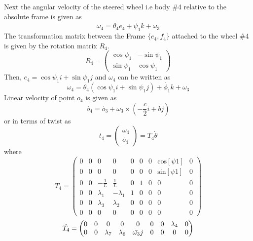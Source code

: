 {Next  the angular velocity of the steered wheel i.e body \#4 relative to the absolute frame is given as 
\[\omega_4=\dot{\theta_4}e_4+ \dot{\psi_1} k +\omega_3\]
The transformation matrix between the Frame $\{e_4,f_4\}$ attached to the wheel \#4 is given by the rotation matrix $R_4$. 
\begin{equation}
\label{eqn:slipR4}
R_4=\begin{pmatrix}
\cos \psi_1 & - \sin \psi_1\\
\sin \psi_1 & \cos\psi_1
\end{pmatrix}
\end{equation}
Then, $e_4= \cos\psi_1 i +\sin \psi_1 j$  and $\omega_4$ can be written as 
\[ \omega_4= \dot{\theta_4}( \cos\psi_1 i +\sin \psi_1 j)+ \dot{\phi_1} k +\omega_3 \]
Linear velocity of point $o_4$ is given as 
\[ \dot{o_4}=\dot{o_3}+\omega_3 \times (-\frac{c}{2}i+bj) \]
or in terms of twist as
\begin{equation}
\label{eqn:slip_t4}
t_4=
\begin{pmatrix}
\omega_4\\
\dot{o_4}
\end{pmatrix}=T_4 \dot{\theta}
\end{equation}
where 
\begin{equation}
\label{eqn:slip_T4}
T_4=\left(
\begin{array}{ccccccccc}
0 & 0 & 0 & 0 & 0 & 0 & 0 & \text{cos}[\text{$\psi $1}] & 0 \\
0 & 0 & 0 & 0 & 0 & 0 & 0 & \text{sin}[\text{$\psi $1}] & 0 \\
0 & 0 & -\frac{1}{L} & \frac{1}{L} & 0 & 1 & 0 & 0 & 0 \\
0 & 0 & \lambda_1 & -\lambda_1 & 1 & 0 & 0 & 0 & 0 \\
0 & 0 &\lambda_3 & \lambda_2 & 0 & 0 & 0 & 0 & 0 \\
0 & 0 & 0 & 0 & 0 & 0 & 0 & 0 & 0
\end{array}
\right)
\end{equation}
\begin{equation}
\label{eqn{:slip_dT4}}
\dot{T_4}=\begin{pmatrix}
0 & 0 & 0 & 0 & 0 & 0 & 0 & \lambda_4 & 0\\
0 & 0 & \lambda_7 & \lambda_6 & \bar{\omega_3}j & 0 & 0 & 0 & 0
\end{pmatrix}
\end{equation}

}
